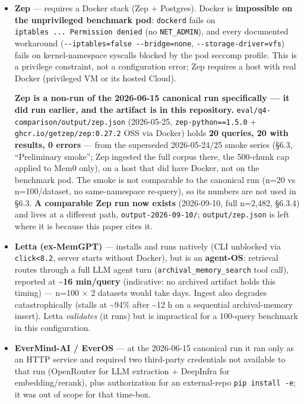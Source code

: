 \documentclass[
]{article}
\newcounter{none} %
\begin{document}
\begin{itemize}
\item
  \textbf{Zep} --- requires a Docker stack (Zep + Postgres). Docker is
  \textbf{impossible on the unprivileged benchmark pod}:
  \texttt{dockerd} fails on \texttt{iptables\ ...\ Permission\ denied}
  (no \texttt{NET\_ADMIN}), and every documented workaround
  (\texttt{-\/-iptables=false\ -\/-bridge=none},
  \texttt{-\/-storage-driver=vfs}) fails on kernel-namespace syscalls
  blocked by the pod seccomp profile. This is a privilege constraint,
  not a configuration error; Zep requires a host with real Docker
  (privileged VM or its hosted Cloud).

  \textbf{Zep is a non-run of the 2026-06-15 canonical run specifically
  --- it did run earlier, and the artifact is in this repository.}
  \texttt{eval/q4-comparison/output/zep.json} (2026-05-25,
  \texttt{zep-python==1.5.0} + \texttt{ghcr.io/getzep/zep:0.27.2} OSS
  via Docker) holds \textbf{20 queries, 20 with results, 0 errors} ---
  from the superseded 2026-05-24/25 smoke series (§6.3, ``Preliminary
  smoke''; Zep ingested the full corpus there, the 500-chunk cap applied
  to Mem0 only), on a host that did have Docker, not on the benchmark
  pod. The smoke is not comparable to the canonical run (n=20 vs
  n=100/dataset, no same-namespace re-query), so its numbers are not
  used in §6.3. \textbf{A comparable Zep run now exists} (2026-09-10,
  full n=2,482, §6.3.4) and lives at a different path,
  \texttt{output-2026-09-10/}; \texttt{output/zep.json} is left where it
  is because this paper cites it.
\item
  \textbf{Letta (ex-MemGPT)} --- installs and runs natively (CLI
  unblocked via \texttt{click\textless{}8.2}, server starts without
  Docker), but is an \textbf{agent-OS}: retrieval routes through a full
  LLM agent turn (\texttt{archival\_memory\_search} tool call), reported
  at \textbf{\textasciitilde16 min/query} (indicative: no archived
  artifact holds this timing) --- n=100 × 2 datasets would take days.
  Ingest also degrades catastrophically (stalls at \textasciitilde94\%
  after \textasciitilde12 h on a sequential archival-memory insert).
  Letta \emph{validates} (it runs) but is impractical for a 100-query
  benchmark in this configuration.
\item
  \textbf{EverMind-AI / EverOS} --- at the 2026-06-15 canonical run it
  ran only as an HTTP service and required two third-party credentials
  not available to that run (OpenRouter for LLM extraction + DeepInfra
  for embedding/rerank), plus authorization for an external-repo
  \texttt{pip\ install\ -e}; it was out of scope for that time-box.
\end{itemize}
\end{document}
